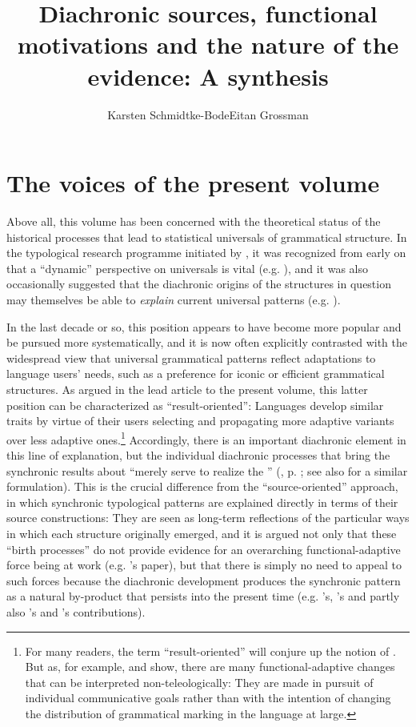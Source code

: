 \documentclass[output=paper]{langsci/langscibook}
\author{Karsten Schmidtke-Bode\affiliation{Leipzig University and Friedrich Schiller University Jena}\lastand Eitan Grossman\affiliation{Hebrew University of Jerusalem}}
\title{Diachronic sources, functional motivations and the nature of the evidence: A synthesis}
\begin{document}
\maketitle 
 
 

\section{The voices of the present volume}\label{sec:epilogue:1}

Above all, this volume has been concerned with the theoretical status of the historical processes that lead to statistical universals of grammatical structure. In the typological research programme initiated by , it was recognized from early on that a “dynamic” perspective on universals is vital (e.g. \citealt{Greenberg1969}), and it was also occasionally suggested that the diachronic origins of the structures in question may themselves be able to \textit{explain} current universal patterns (e.g. \citealt{Givón1975,Greenberg1978_Diachr}). 

In the last decade or so, this position appears to have become more popular and be pursued more systematically, and it is now often explicitly contrasted with the widespread view that universal grammatical patterns reflect adaptations to language users’ needs, such as a preference for iconic or efficient grammatical structures. As argued in the lead article to the present volume, this latter position can be characterized as “result-oriented”: Languages develop similar traits by virtue of their users selecting and propagating more adaptive variants over less adaptive ones.\footnote{For many readers, the term “result-oriented” will conjure up the notion of . But as, for example, \citet{Keller1994} and \citet[64--71]{Croft2000_Change} show, there are many functional-adaptive changes that can be interpreted non-teleologically: They are made in pursuit of individual communicative goals rather than with the intention of changing the distribution of grammatical marking in the language at large.} Accordingly, there is an important diachronic element in this line of explanation, but the individual diachronic processes that bring the synchronic results about “merely serve to realize the ” (, p. \pageref{p:haspelmath:merelyserve}; see also \citet[266]{Hawkins2004} for a similar formulation). This is the crucial difference from the “source-oriented” approach, in which synchronic typological patterns are explained directly in terms of their source constructions: They are seen as long-term reflections of the particular ways in which each structure originally emerged, and it is argued not only that these “birth processes” do not provide evidence for an overarching functional-adaptive force being at work (e.g. ’s paper), but that there is simply no need to appeal to such forces because the diachronic development produces the synchronic pattern as a natural by-product that persists into the present time (e.g. ’s, ’s and partly also ’s and ’s contributions). 
\end{document}

